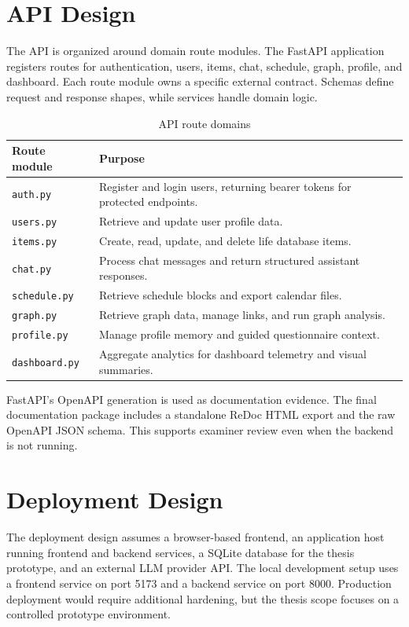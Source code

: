 \section{API Design}

The API is organized around domain route modules. The FastAPI application registers routes for authentication, users, items, chat, schedule, graph, profile, and dashboard. Each route module owns a specific external contract. Schemas define request and response shapes, while services handle domain logic.

\begin{table}[H]
\centering
\caption{API route domains}
\label{tab:route-domains}
\begin{tabular}{|p{}|p{}|}
\hline
\textbf{Route module} & \textbf{Purpose}\\
\hline
\texttt{auth.py} & Register and login users, returning bearer tokens for protected endpoints.\\
\hline
\texttt{users.py} & Retrieve and update user profile data.\\
\hline
\texttt{items.py} & Create, read, update, and delete life database items.\\
\hline
\texttt{chat.py} & Process chat messages and return structured assistant responses.\\
\hline
\texttt{schedule.py} & Retrieve schedule blocks and export calendar files.\\
\hline
\texttt{graph.py} & Retrieve graph data, manage links, and run graph analysis.\\
\hline
\texttt{profile.py} & Manage profile memory and guided questionnaire context.\\
\hline
\texttt{dashboard.py} & Aggregate analytics for dashboard telemetry and visual summaries.\\
\hline
\end{tabular}
\end{table}

FastAPI's OpenAPI generation is used as documentation evidence. The final documentation package includes a standalone ReDoc HTML export and the raw OpenAPI JSON schema. This supports examiner review even when the backend is not running.

\section{Deployment Design}

The deployment design assumes a browser-based frontend, an application host running frontend and backend services, a SQLite database for the thesis prototype, and an external LLM provider API. The local development setup uses a frontend service on port 5173 and a backend service on port 8000. Production deployment would require additional hardening, but the thesis scope focuses on a controlled prototype environment.


